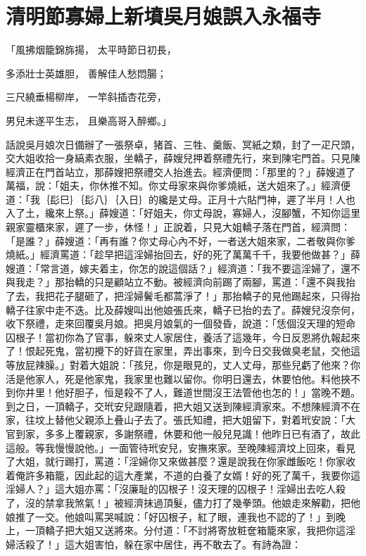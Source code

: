 %

\chapter{清明節寡婦上新墳\KG 吳月娘誤入永福寺}


\begin{showcontents}{}



「風拂烟籠錦旆揚，  太平時節日初長，

多添壯士英雄胆，  善解佳人愁悶腸；

三尺繞垂楊柳岸，  一竿斜插杏花旁，

男兒未遂平生志，  且樂高哥入醉鄉。」

話說吳月娘次日備辦了一張祭卓，猪首、三牲、羹飯、冥紙之類，封了一疋尺頭，交大姐收拾一身縞素衣服，坐轎子，薛嫂兒押着祭禮先行，來到陳宅門首。只見陳經濟正在門首站立，那薛嫂把祭禮交人抬進去。經濟便問：「那里的？」薛嫂道了萬福，說：「姐夫，你休推不知。你丈母家來與你爹燒紙，送大姐來了。」經濟便道：「我｛髟巳｝｛髟八｝｛入日｝的纔是丈母。正月十六貼門神，遲了半月！人也入了土，纔來上祭。」薛嫂道：「好姐夫，你丈母說，寡婦人，沒腳蟹，不知你這里親家靈櫃來家，遲了一步，休怪！」正說着，只見大姐轎子落在門首，經濟問：「是誰？」薛嫂道：「再有誰？你丈母心內不好，一者送大姐來家，二者敬與你爹燒紙。」經濟罵道：「趁早把這淫婦抬回去，好的死了萬萬千千，我要他做甚？」薛嫂道：「常言道，嫁夫着主，你怎的說這個話？」經濟道：「我不要這淫婦了，還不與我走？」那抬轎的只是顧站立不動。被經濟向前踢了兩腳，罵道：「還不與我抬了去，我把花子腿砸了，把淫婦鬢毛都蒿淨了！」那抬轎子的見他踢起來，只得抬轎子往家中走不迭。比及薛嫂叫出他娘張氏來，轎子已抬的去了。薛嫂兒沒奈何，收下祭禮，走來回覆吳月娘。把吳月娘氣的一個發昏，說道：「恁個沒天理的短命囚根子！當初你為了官事，躲來丈人家居住，養活了這幾年，今日反恩將仇報起來了！恨起死鬼，當初攪下的好貨在家里，弄出事來，到今日交我做臭老鼠，交他這等放屁辣臊。」對着大姐說：「孩兒，你是眼見的，丈人丈母，那些兒虧了他來？你活是他家人，死是他家鬼，我家里也難以留你。你明日還去，休要怕他。料他挾不到你井里！他好胆子，恒是殺不了人，難道世間沒王法管他也怎的！」當晚不題。到之日，一頂轎子，交玳安兒跟隨着，把大姐又送到陳經濟家來。不想陳經濟不在家，往坟上替他父親添上叠山子去了。張氏知禮，把大姐留下，對着玳安說：「大官到家，多多上覆親家，多謝祭禮，休要和他一般兒見識！他昨日已有酒了，故此這般。等我慢慢說他。」一面管待玳安兒，安撫來家。至晚陳經濟坟上回來，看見了大姐，就行踢打，罵道：「淫婦你又來做甚麼？還是說我在你家雌飯吃！你家收着俺許多箱籠，因此起的這大產業，不道的白養了女婿！好的死了萬千，我要你這淫婦人？」這大姐亦罵：「沒廉耻的囚根子！沒天理的囚根子！淫婦出去吃人殺了，沒的禁拿我煞氣！」被經濟抹過頂髮，儘力打了幾拳頭。他娘走來解勸，把他娘推了一交。他娘叫罵哭喊說：「好囚根子，紅了眼，連我也不認的了！」到晚上，一頂轎子把大姐又送將來。分付道：「不討將寄放粧奩箱籠來家，我把你這淫婦活殺了！」這大姐害怕，躲在家中居住，再不敢去了。有詩為證：


\end{showcontents}
